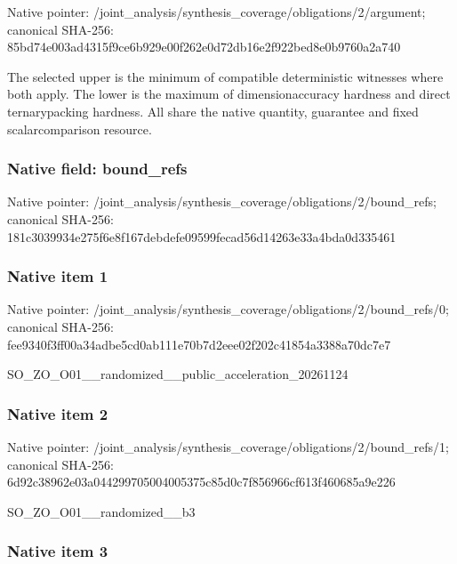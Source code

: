 \documentclass[10pt,a4paper]{article}
\begin{document}
Native pointer: /joint\_analysis/synthesi\allowbreak{}s\_coverage/obligations/2\allowbreak{}/argument; canonical SHA-256: 85bd74e003ad4315f9ce6b92\allowbreak{}9e00f262e0d72db16e2f922b\allowbreak{}ed8e0b9760a2a740


The selected upper is the minimum of compatible deterministic witnesses where both apply. The lower is the maximum of dimensionaccuracy hardness and direct ternarypacking hardness. All share the native quantity, guarantee and fixed scalarcomparison resource.


\subsubsection{Native field: bound\_refs}


Native pointer: /joint\_analysis/synthesi\allowbreak{}s\_coverage/obligations/2\allowbreak{}/bound\_refs; canonical SHA-256: 181c3039934e275f6e8f167d\allowbreak{}ebdefe09599fecad56d14263\allowbreak{}e33a4bda0d335461



\subsubsection{Native item 1}


Native pointer: /joint\_analysis/synthesi\allowbreak{}s\_coverage/obligations/2\allowbreak{}/bound\_refs/0; canonical SHA-256: fee9340f3ff00a34adbe5cd0\allowbreak{}ab111e70b7d2eee02f202c41\allowbreak{}854a3388a70dc7e7


SO\_ZO\_O01\_\_randomized\_\_p\allowbreak{}ublic\_acceleration\_20261\allowbreak{}124


\subsubsection{Native item 2}


Native pointer: /joint\_analysis/synthesi\allowbreak{}s\_coverage/obligations/2\allowbreak{}/bound\_refs/1; canonical SHA-256: 6d92c38962e03a0442997050\allowbreak{}04005375c85d0c7f856966cf\allowbreak{}613f460685a9e226


SO\_ZO\_O01\_\_randomized\_\_b3


\subsubsection{Native item 3}
\end{document}
